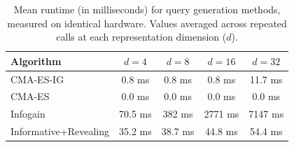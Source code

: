 \begin{table}[t]
\centering
\caption{Mean runtime (in milliseconds) for query generation methods, measured on identical hardware. Values averaged across repeated calls at each representation dimension ($d$).}
\label{tab:runtime}
\begin{tabular}{l cccc}
\toprule
\textbf{Algorithm} & $d=4$ & $d=8$ & $d=16$ & $d=32$ \\
\midrule
CMA-ES-IG & 0.8 ms & 0.8 ms & 0.8 ms & 11.7 ms \\
CMA-ES & 0.0 ms & 0.0 ms & 0.0 ms & 0.0 ms \\
Infogain & 70.5 ms & 382 ms & 2771 ms & 7147 ms \\
Informative+Revealing & 35.2 ms & 38.7 ms & 44.8 ms & 54.4 ms \\
\bottomrule
\end{tabular}
\end{table}
